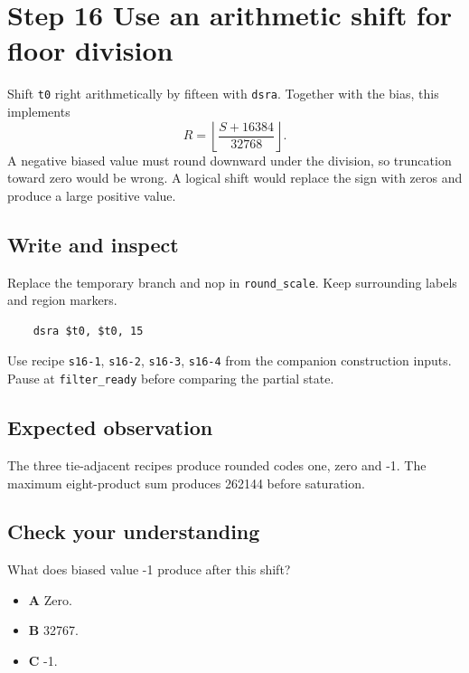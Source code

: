 \section{Step 16 Use an arithmetic shift for floor division}\label{fir-s16}

Shift \texttt{t0} right arithmetically by fifteen with \texttt{dsra}. Together with the bias, this implements
\[R=\left\lfloor\frac{S+16384}{32768}\right\rfloor.\]
A negative biased value must round downward under the division, so truncation toward zero would be wrong. A logical shift would replace the sign with zeros and produce a large positive value.

\subsection{Write and inspect}
Replace the temporary branch and nop in \texttt{round\_scale}. Keep surrounding labels and region markers.

\begin{verbatim}
    dsra $t0, $t0, 15
\end{verbatim}
Use recipe \texttt{s16-1}, \texttt{s16-2}, \texttt{s16-3}, \texttt{s16-4} from the companion construction inputs. Pause at \texttt{filter\_ready} before comparing the partial state.

\subsection{Expected observation}
The three tie-adjacent recipes produce rounded codes one, zero and -1. The maximum eight-product sum produces 262144 before saturation.

\subsection{Check your understanding}
What does biased value -1 produce after this shift?

\begin{itemize}
  \item \textbf{A} Zero.
  \item \textbf{B} 32767.
  \item \textbf{C} -1.
\end{itemize}
